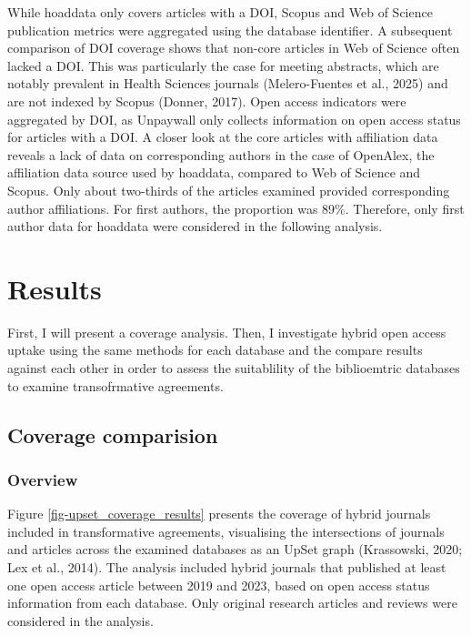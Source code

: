 \documentclass[a4paper,man,floatsintext,longtable,noextraspace,10pt]{apa6}
\begin{document}
While hoaddata only covers articles with a DOI, Scopus and Web of
Science publication metrics were aggregated using the database
identifier. A subsequent comparison of DOI coverage shows that non-core
articles in Web of Science often lacked a DOI. This was particularly the
case for meeting abstracts, which are notably prevalent in Health
Sciences journals (Melero-Fuentes et al., 2025) and are not indexed by
Scopus (Donner, 2017). Open access indicators were aggregated by DOI, as
Unpaywall only collects information on open access status for articles
with a DOI. A closer look at the core articles with affiliation data
reveals a lack of data on corresponding authors in the case of OpenAlex,
the affiliation data source used by hoaddata, compared to Web of Science
and Scopus. Only about two-thirds of the articles examined provided
corresponding author affiliations. For first authors, the proportion was
89\%. Therefore, only first author data for hoaddata were considered in
the following analysis.

\section{Results}\label{results}

First, I will present a coverage analysis. Then, I investigate hybrid
open access uptake using the same methods for each database and the
compare results against each other in order to assess the suitablility
of the biblioemtric databases to examine transofrmative agreements.

\subsection{Coverage comparision}\label{coverage-comparision}

\subsubsection{Overview}\label{overview}

Figure \ref{fig-upset_coverage_results} presents the coverage of hybrid
journals included in transformative agreements, visualising the
intersections of journals and articles across the examined databases as
an UpSet graph (Krassowski, 2020; Lex et al., 2014). The analysis
included hybrid journals that published at least one open access article
between 2019 and 2023, based on open access status information from each
database. Only original research articles and reviews were considered in
the analysis.
\end{document}
